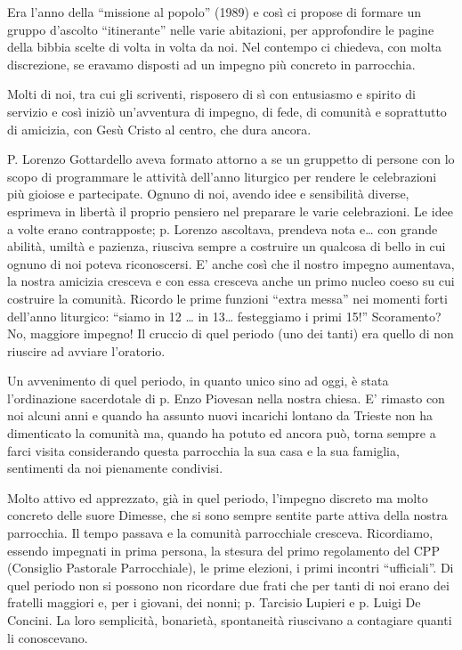 Era l’anno della “missione al popolo” (1989) e così ci propose di formare un gruppo d’ascolto 
“itinerante” nelle varie abitazioni, per approfondire le pagine della bibbia scelte di volta in volta da 
noi. Nel contempo ci chiedeva, con molta discrezione, se eravamo disposti ad un impegno più 
concreto in parrocchia.

Molti di noi, tra cui gli scriventi, risposero di sì con entusiasmo e spirito di servizio e così iniziò 
un’avventura di impegno, di fede, di comunità e soprattutto di amicizia, con Gesù Cristo al centro, 
che dura ancora.

P. Lorenzo Gottardello aveva formato attorno a se un gruppetto di persone con lo scopo di 
programmare le attività dell’anno liturgico per rendere le celebrazioni più gioiose e partecipate. 
Ognuno di noi, avendo idee e sensibilità diverse, esprimeva in libertà il proprio pensiero nel 
preparare le varie celebrazioni. Le idee a volte erano contrapposte; p. Lorenzo ascoltava, prendeva 
nota e… con grande abilità, umiltà e pazienza, riusciva sempre a costruire un qualcosa di bello in 
cui ognuno di noi poteva riconoscersi. E’ anche così che il nostro impegno aumentava, la nostra 
amicizia cresceva e con essa cresceva anche un primo nucleo coeso su cui costruire la comunità. 
Ricordo le prime funzioni “extra messa” nei momenti forti dell’anno liturgico: “siamo in 12 … in 
13… festeggiamo i primi 15!” Scoramento? No, maggiore impegno!
Il cruccio di quel periodo (uno dei tanti) era quello di non riuscire ad avviare l’oratorio.

Un avvenimento di quel periodo, in quanto unico sino ad oggi, è stata l’ordinazione 
sacerdotale di p. Enzo Piovesan nella nostra chiesa. E’ rimasto con noi alcuni anni e quando ha 
assunto nuovi incarichi lontano da Trieste non ha dimenticato la comunità ma, quando ha potuto ed 
ancora può, torna sempre a farci visita considerando questa parrocchia la sua casa e la sua famiglia, 
sentimenti da noi pienamente condivisi.

Molto attivo ed apprezzato, già in quel periodo, l’impegno discreto ma molto concreto delle 
suore Dimesse, che si sono sempre sentite parte attiva della nostra parrocchia.
Il tempo passava e la comunità parrocchiale cresceva. Ricordiamo, essendo impegnati in prima 
persona, la stesura del primo regolamento del CPP (Consiglio Pastorale Parrocchiale), le prime 
elezioni, i primi incontri “ufficiali”. 
Di quel periodo non si possono non ricordare due frati che per tanti di noi erano dei fratelli maggiori 
e, per i giovani, dei nonni; p. Tarcisio Lupieri e p. Luigi De Concini. La loro semplicità, bonarietà, 
spontaneità riuscivano a contagiare quanti li conoscevano.

